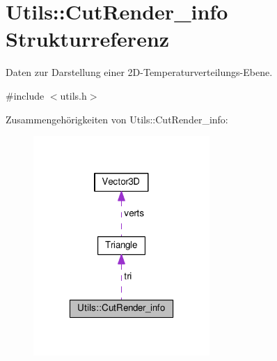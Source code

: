 \hypertarget{structUtils_1_1CutRender__info}{\section{Utils\-:\-:Cut\-Render\-\_\-info Strukturreferenz}
\label{structUtils_1_1CutRender__info}
}


Daten zur Darstellung einer 2\-D-\/\-Temperaturverteilungs-\/\-Ebene.  




{\ttfamily \#include $<$utils.\-h$>$}



Zusammengehörigkeiten von Utils\-:\-:Cut\-Render\-\_\-info\-:
\nopagebreak
\begin{figure}[H]
\begin{center}
\leavevmode
\includegraphics[width=190pt]{structUtils_1_1CutRender__info__coll__graph}
\end{center}
\end{figure}
